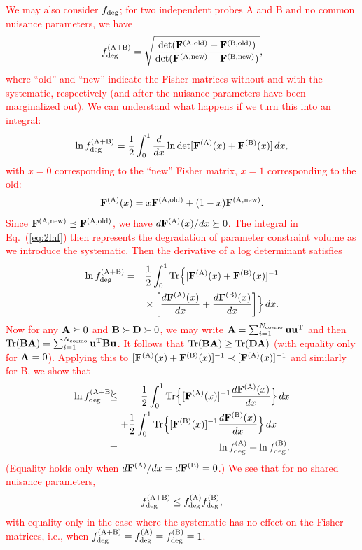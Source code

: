 \documentclass[usenatbib]{mnras}
\newcommand{\changetext}[1]{\textcolor{red}{#1}}
\begin{document}
\changetext{We may also consider $f_{\rm deg}$; for two independent probes A and B and no common nuisance parameters, we have
\begin{equation}
f_{\rm deg}^{\rm(A+B)} = \sqrt{ \frac{\det ({\bf F}^{\rm(A,old)} + {\bf F}^{\rm(B,old)})}{\det ({\bf F}^{\rm(A,new)} + {\bf F}^{\rm(B,new)})} },
\end{equation}
where ``old'' and ``new'' indicate the Fisher matrices without and with the systematic, respectively (and after the nuisance parameters have been marginalized out). We can understand what happens if we turn this into an integral:
\begin{equation}
\ln f_{\rm deg}^{\rm(A+B)} = \frac12 \int_0^1 \frac{d}{d x} \ln \det[{\bf F}^{\rm(A)}(x) + {\bf F}^{\rm(B)}(x)]\,d x,
\label{eq:2lnf}
\end{equation}
with $x=0$ corresponding to the ``new'' Fisher matrix, $x=1$ corresponding to the old:
\begin{equation}
{\bf F}^{\rm(A)}(x) = x {\bf F}^{\rm(A,old)} + (1-x) {\bf F}^{\rm(A,new)}.
\end{equation}
Since ${\bf F}^{\rm(A,new)}\preceq {\bf F}^{\rm(A,old)}$, we have $d{\bf F}^{\rm(A)}(x)/dx \succeq 0$. The integral in Eq.~(\ref{eq:2lnf}) then represents the degradation of parameter constraint volume as we introduce the systematic. Then the derivative of a log determinant satisfies
\begin{eqnarray}
\ln f_{\rm deg}^{\rm(A+B)} &=& \frac12 \int_0^1 {\rm Tr} \Bigl\{ [{\bf F}^{\rm(A)}(x) + {\bf F}^{\rm(B)}(x)]^{-1}
\nonumber \\ && \times
\left[ \frac{d{\bf F}^{\rm(A)}(x)}{dx} + \frac{d{\bf F}^{\rm(B)}(x)}{dx} \right]
\Bigr\}
\,d x.
\end{eqnarray}
Now for any ${\bf A}\succeq0$ and ${\bf B}\succ {\bf D} \succ 0$, we may write ${\bf A} = \sum_{i=1}^{N_{\rm cosmo}} {\bf uu}^{\rm T}$ and then ${\rm Tr}({\bf BA}) = \sum_{i=1}^{N_{\rm cosmo}} {\bf u}^{\rm T}{\bf Bu}$. It follows that ${\rm Tr}({\bf BA})\ge {\rm Tr}({\bf DA})$ (with equality only for ${\bf A}=0$). Applying this to $[{\bf F}^{\rm(A)}(x) + {\bf F}^{\rm(B)}(x)]^{-1} \prec [{\bf F}^{\rm(A)}(x)]^{-1}$ and similarly for B, we show that
\begin{eqnarray}
\ln f_{\rm deg}^{\rm(A+B)} \!\!\!\! &\le&\!\!\!\! \frac12 \int_0^1 {\rm Tr} \Bigl\{ [{\bf F}^{\rm(A)}(x)]^{-1}\frac{d{\bf F}^{\rm(A)}(x)}{dx} \Bigr\} \,d x
\nonumber \\ &&\!\!\!\!
+ \frac12 \int_0^1 {\rm Tr} \Bigl\{ [{\bf F}^{\rm(B)}(x)]^{-1}\frac{d{\bf F}^{\rm(B)}(x)}{dx} \Bigr\} \,d x~~~~
\nonumber \\
&=& \ln f_{\rm deg}^{\rm(A)} + \ln f_{\rm deg}^{\rm(B)}.
\end{eqnarray}
(Equality holds only when $d{\bf F}^{\rm(A)}/dx = d{\bf F}^{\rm(B)}=0$.) We see that for no shared nuisance parameters,
\begin{equation}
f_{\rm deg}^{\rm(A+B)} \le f_{\rm deg}^{\rm(A)} f_{\rm deg}^{\rm(B)},
\end{equation}
with equality only in the case where the systematic has no effect on the Fisher matrices, i.e., when $f_{\rm deg}^{\rm(A+B)} = f_{\rm deg}^{\rm(A)} = f_{\rm deg}^{\rm(B)} = 1$.
}
\end{document}
